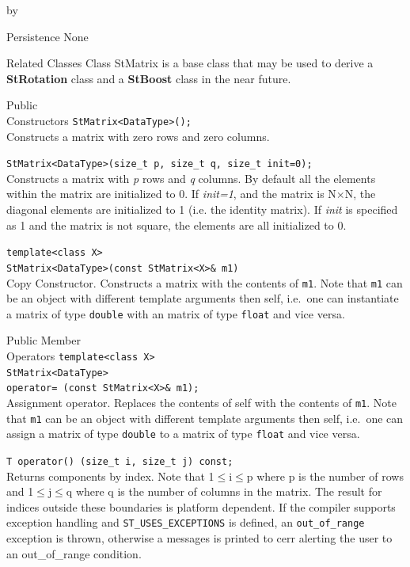 \documentclass[twoside]{article}
\newcommand{\comp}[1]{\texttt{#1}}%
\newcommand{\entrylabel}[1]{\mbox{\textbf{{#1}}}\hfil}%
\newenvironment{entry}
{\begin{list}{}%
    {\renewcommand{\makelabel}{\entrylabel}%
     \setlength{\labelwidth}{90pt}%
     \setlength{\leftmargin}{\labelwidth}
     \advance\leftmargin by \labelsep%
      }%
    }%
  {\end{list}}
\newcommand{\Entrylabel}[1]%
{\raisebox{0pt}[1ex][0pt]{\makebox[\labelwidth][l]%
    {\parbox[t]{\labelwidth}{\hspace{0pt}\textbf{{#1}}}}}}
\newenvironment{Entry}%
{\renewcommand{\entrylabel}{\Entrylabel}\begin{entry}}%
  {\end{entry}}
\begin{document}
\begin{Entry}
\item[Persistence]
    None

\item[Related Classes]
    Class StMatrix is a base class that may be used to derive
    a {\bf StRotation} class
    and a {\bf StBoost} class in the near future.

\item[Public\\ Constructors]
    \verb+StMatrix<DataType>();+ \\
    Constructs a matrix with zero rows and zero columns.
    
    \verb+StMatrix<DataType>(size_t p, size_t q, size_t init=0);+ \\
    Constructs a matrix with {\em p} rows and {\em q} columns.  By
    default all the elements within the matrix are initialized
    to 0.  If {\em init=1}, and the matrix is N$\times$N, the diagonal
    elements are initialized to 1 (i.e. the identity matrix).  If
    {\em init} is specified as 1 and the matrix is not square, the
    elements are all initialized to 0.

    \verb+template<class X>+\\
    \verb+StMatrix<DataType>(const StMatrix<X>& m1)+\\
    Copy Constructor. Constructs a matrix with the contents of \comp{m1}.
    Note that \comp{m1} can be an object with different
    template arguments then self, i.e.~one can instantiate
    a matrix of type \comp{double} with an matrix of type
    \comp{float} and vice versa.   
    
\item[Public Member\\ Operators]
    \verb+template<class X>+\\
    \verb+StMatrix<DataType>+\\
    \verb+operator= (const StMatrix<X>& m1);+ \\
    Assignment operator. Replaces the contents of self with the
    contents of \comp{m1}.
    Note that \comp{m1} can be an object with different
    template arguments then self, i.e.~one can assign
    a matrix of type \comp{double} to a matrix of type
    \comp{float} and vice versa.  
    
    \verb+T operator() (size_t i, size_t j) const;+\\
    Returns components by index. Note that 1$\leq$i$\leq$p where p
    is the number of rows and 1$\leq$j$\leq$q where q is
    the number of columns in the matrix.  The result for
    indices outside these boundaries is platform
    dependent. If the compiler supports exception handling and
    \comp{ST\_USES\_EXCEPTIONS} is defined, an 
    \comp{out\_of\_range} exception is thrown, otherwise a
    messages is printed to cerr alerting the user to an out\_of\_range
    condition.


\end{Entry}
\end{document}
